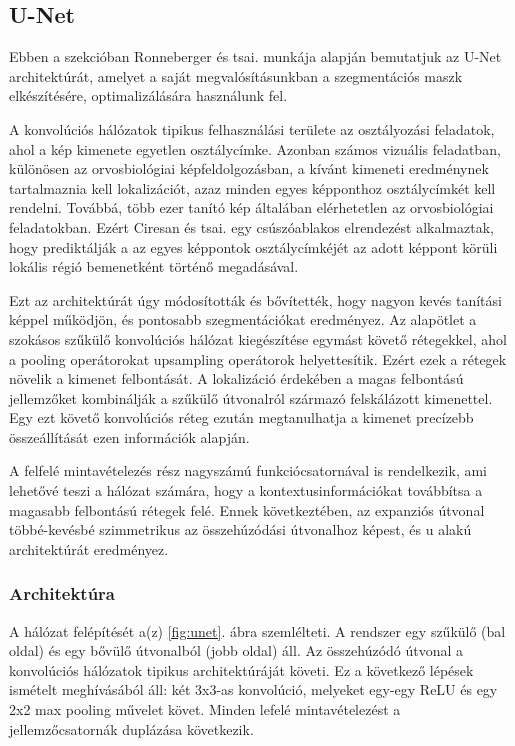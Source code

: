 \documentclass[12pt,a4]{article}
\begin{document}
    \subsection{U-Net}

    Ebben a szekcióban Ronneberger és tsai. \cite{unet} munkája alapján bemutatjuk az U-Net architektúrát, amelyet a saját megvalósításunkban a szegmentációs maszk elkészítésére, optimalizálására használunk fel. 

    A konvolúciós hálózatok tipikus felhasználási területe az osztályozási feladatok, ahol
a kép kimenete egyetlen osztálycímke. Azonban számos vizuális feladatban,
különösen az orvosbiológiai képfeldolgozásban, a kívánt kimeneti eredménynek tartalmaznia kell
lokalizációt, azaz minden egyes képponthoz osztálycímkét kell rendelni. Továbbá,
több ezer tanító kép általában elérhetetlen az orvosbiológiai feladatokban.
Ezért Ciresan és tsai. \cite{ciresan} egy csúszóablakos elrendezést alkalmaztak, hogy prediktálják a
az egyes képpontok osztálycímkéjét az adott képpont körüli lokális régió bemenetként történő megadásával.

Ezt az architektúrát úgy módosították és bővítették, hogy
nagyon kevés tanítási képpel működjön, és pontosabb szegmentációkat eredményez.
Az alapötlet a szokásos szűkülő konvolúciós hálózat kiegészítése egymást követő rétegekkel, ahol a pooling operátorokat upsampling operátorok helyettesítik.
Ezért ezek a rétegek növelik a kimenet felbontását. A lokalizáció érdekében a magas
felbontású jellemzőket kombinálják a szűkülő útvonalról származó felskálázott kimenettel. Egy ezt követő konvolúciós réteg ezután megtanulhatja a kimenet precízebb összeállítását ezen információk alapján.

A felfelé mintavételezés
rész nagyszámú funkciócsatornával is rendelkezik, ami lehetővé teszi a hálózat számára, hogy
a kontextusinformációkat továbbítsa a magasabb felbontású rétegek felé. Ennek következtében,
az expanziós útvonal többé-kevésbé szimmetrikus az összehúzódási útvonalhoz képest, és
u alakú architektúrát eredményez.

\subsubsection{Architektúra}

A hálózat felépítését a(z) \ref{fig:unet}. ábra szemlélteti. A rendszer egy szűkülő
(bal oldal) és egy bővülő útvonalból (jobb oldal) áll. Az összehúzódó útvonal
a konvolúciós hálózatok tipikus architektúráját követi. 
Ez a következő lépések ismételt meghívásából áll:
    két 3x3-as konvolúció, melyeket egy-egy ReLU és egy 2x2 max pooling művelet követ. Minden lefelé mintavételezést a jellemzőcsatornák duplázása következik. 
\end{document}
